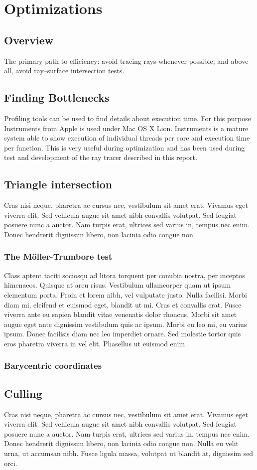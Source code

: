\chapter{Optimizations}
\section{Overview}
The primary path to efficiency: avoid tracing rays whenever possible; and above all, avoid ray–surface intersection tests.
\section{Finding Bottlenecks}
Profiling tools can be used to find details about execution time. For this purpose Instruments from Apple is used under Mac OS X Lion.
Instruments is a mature system able to show execution of individual threads per core and execution time per function. This is very useful during
optimization and has been used during test and development of the ray tracer described in this report.
\section{Triangle intersection}
Cras nisi neque, pharetra ac cursus nec, vestibulum sit amet erat. Vivamus eget viverra elit. Sed vehicula augue sit amet nibh convallis volutpat. Sed feugiat posuere nunc a auctor. Nam turpis erat, ultrices sed varius in, tempus nec enim. Donec hendrerit dignissim libero, non lacinia odio congue non. 
\subsection{The M\"{o}ller-Trumbore test}
Class aptent taciti sociosqu ad litora torquent per conubia nostra, per inceptos himenaeos. Quisque at arcu risus. Vestibulum ullamcorper quam ut ipsum elementum porta. Proin et lorem nibh, vel vulputate justo. Nulla facilisi. Morbi diam mi, eleifend et euismod eget, blandit ut mi. Cras et convallis erat. Fusce viverra ante eu sapien blandit vitae venenatis dolor rhoncus. Morbi sit amet augue eget ante dignissim vestibulum quis ac ipsum. Morbi eu leo mi, eu varius ipsum. Donec facilisis diam nec leo imperdiet ornare. Sed molestie tortor quis eros pharetra viverra in vel elit. Phasellus ut euismod enim
\cite{moller1997}
\subsection{Barycentric coordinates}
\section{Culling}
Cras nisi neque, pharetra ac cursus nec, vestibulum sit amet erat. Vivamus eget viverra elit. Sed vehicula augue sit amet nibh convallis volutpat. Sed feugiat posuere nunc a auctor. Nam turpis erat, ultrices sed varius in, tempus nec enim. Donec hendrerit dignissim libero, non lacinia odio congue non. Nulla eu velit urna, ut accumsan nibh. Fusce ligula massa, volutpat ut blandit at, dignissim sed orci. 

